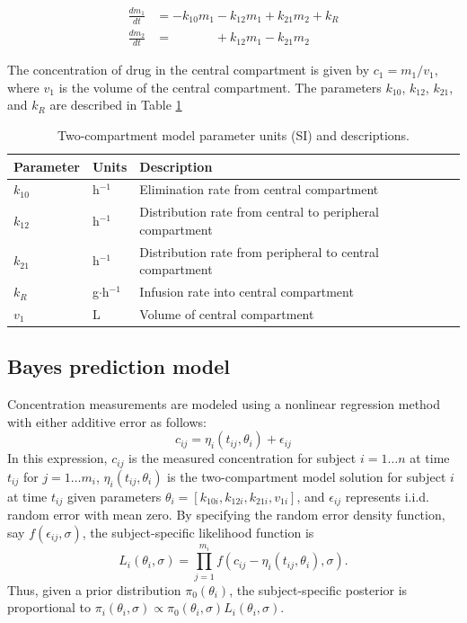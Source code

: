 \documentclass{article}\usepackage[]{graphicx}\usepackage[]{color}
\begin{document}
\begin{align}
\frac{dm_1}{dt} &= -k_{10}m_1 - k_{12}m_1 + k_{21}m_2 + k_R \nonumber \\
\frac{dm_2}{dt} &= \phantom{-k_{10}m_1} + k_{12}m_1 - k_{21}m_2 \nonumber
\end{align}

The concentration of drug in the central compartment is given by $c_1 = m_1/v_1$, where $v_1$ is the volume of the central compartment. The parameters $k_{10}$, $k_{12}$, $k_{21}$, and $k_R$ are described in Table \ref{tab:pkpars}

\begin{table}
\begin{tabular}{lll} \hline
Parameter & Units & Description \\ \hline
$k_{10}$ & h$^{-1}$ & Elimination rate from central compartment\\
$k_{12}$ & h$^{-1}$ & Distribution rate from central to peripheral compartment\\
$k_{21}$ & h$^{-1}$ & Distribution rate from peripheral to central compartment\\
$k_R$  & g$\cdot$h$^{-1}$ & Infusion rate into central compartment\\
$v_1$  & L & Volume of central compartment\\
\hline
\end{tabular}
\caption{Two-compartment model parameter units (SI) and descriptions. \label{tab:pkpars}}
\end{table}

\subsection{Bayes prediction model}
Concentration measurements are modeled using a nonlinear regression method with either additive error as follows:
\begin{displaymath}
c_{ij} = \eta_i(t_{ij}, \theta_i) + \epsilon_{ij}
\end{displaymath}
\noindent In this expression, $c_{ij}$ is the measured concentration for subject $i = 1 \ldots n$ at time $t_{ij}$ for $j = 1 \ldots m_i$, $\eta_i(t_{ij}, \theta_i)$ is the two-compartment model solution for subject $i$ at time $t_{ij}$ given parameters $\theta_i = [k_{10i}, k_{12i}, k_{21i}, v_{1i}]$, and $\epsilon_{ij}$ represents i.i.d. random error with mean zero. By specifying the random error density function, say $f(\epsilon_{ij}, \sigma)$, the subject-specific likelihood function is
\begin{displaymath}
L_i(\theta_i, \sigma) = \prod_{j=1}^{m_i} f(c_{ij} - \eta_i(t_{ij}, \theta_i), \sigma).
\end{displaymath}
\noindent Thus, given a prior distribution $\pi_0(\theta_i)$, the subject-specific posterior is proportional to $\pi_i(\theta_i, \sigma) \propto \pi_0(\theta_i,\sigma)L_i(\theta_i,\sigma)$.
\end{document}
